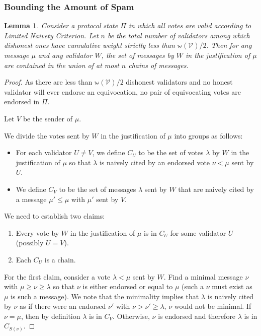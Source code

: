 \documentclass[12pt, fleqn]{article}
\newtheorem{lemma}{Lemma}
\newcommand{\ww}{\mathbb{w}}
\begin{document}
\subsubsection{Bounding the Amount of Spam}

\begin{lemma}\label{chainBoundLemma}
Consider a protocol state $\Pi$ in which all votes are valid according to Limited Naivety Criterion. Let $n$ be the total number of validators among which dishonest ones have cumulative weight strictly less than $\ww(\mathcal{V})/2$. Then for any message $\mu$ and any validator $W$, the set of messages by $W$ in the justification of $\mu$ are contained in the union of at most $n$ chains of messages.
\end{lemma}

\begin{proof}
As there are less than $\ww(\mathcal{V})/2$ dishonest validators and no honest validator will ever endorse an equivocation, no pair of equivocating votes are endorsed in $\Pi$. 

Let $V$ be the sender of $\mu$.

We divide the votes sent by $W$ in the justification of $\mu$ into groups as follows:
\begin{itemize}
\item For each validator $U \neq V$, we define $C_U$ to be the set of votes $\lambda$ by $W$ in the justification of $\mu$ so that
$\lambda$ is naively cited by an endorsed vote $\nu < \mu$ sent by $U$.
\item We define $C_V$ to be the set of messages $\lambda$ sent by $W$ that are naively cited by a message $\mu' \leq \mu$ with $\mu'$ sent by $V$.
\end{itemize}

We need to establish two claims:
\begin{enumerate}
\item Every vote by $W$ in the justification of $\mu$ is in $C_U$ for some validator $U$ (possibly $U=V$).
\item Each $C_U$ is a chain.
\end{enumerate}

For the first claim, consider a vote $\lambda < \mu$ sent by $W$. Find a minimal message $\nu$ with $\mu \geq \nu \geq \lambda$ so that $\nu$ is either endorsed or equal to $\mu$ (such a $\nu$ must exist as $\mu$ is such a message). We note that the minimality implies that $\lambda$ is naively cited by $\nu$ as if there were an endorsed $\nu'$ with $\nu > \nu' \geq \lambda$, $\nu$ would not be minimal. If $\nu=\mu$, then by definition $\lambda$ is in $C_V$. Otherwise, $\nu$ is endorsed and therefore $\lambda$ is in $C_{S(\nu)}$.


\end{proof}
\end{document}
